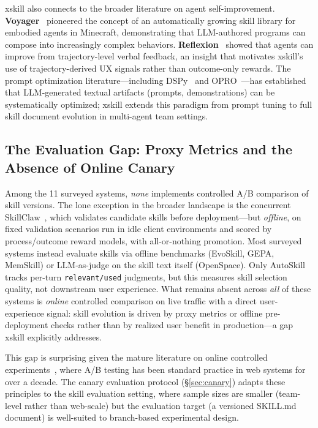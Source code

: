 \documentclass{article}
\begin{document}
xskill also connects to the broader literature on agent self-improvement. \textbf{Voyager}~\citep{wang2023voyager} pioneered the concept of an automatically growing skill library for embodied agents in Minecraft, demonstrating that LLM-authored programs can compose into increasingly complex behaviors. \textbf{Reflexion}~\citep{shinn2023reflexion} showed that agents can improve from trajectory-level verbal feedback, an insight that motivates xskill's use of trajectory-derived UX signals rather than outcome-only rewards. The prompt optimization literature---including DSPy~\citep{khattab2023dspy} and OPRO~\citep{yang2024opro}---has established that LLM-generated textual artifacts (prompts, demonstrations) can be systematically optimized; xskill extends this paradigm from prompt tuning to full skill document evolution in multi-agent team settings.

\subsection{The Evaluation Gap: Proxy Metrics and the Absence of Online Canary}

Among the 11 surveyed systems, \emph{none} implements controlled A/B comparison of skill versions. The lone exception in the broader landscape is the concurrent SkillClaw~\citep{amapml2026skillclaw}, which validates candidate skills before deployment---but \emph{offline}, on fixed validation scenarios run in idle client environments and scored by process/outcome reward models, with all-or-nothing promotion. Most surveyed systems instead evaluate skills via offline benchmarks (EvoSkill, GEPA, MemSkill) or LLM-as-judge on the skill text itself (OpenSpace). Only AutoSkill tracks per-turn \texttt{relevant/used} judgments, but this measures skill selection quality, not downstream user experience. What remains absent across \emph{all} of these systems is \emph{online} controlled comparison on live traffic with a direct user-experience signal: skill evolution is driven by proxy metrics or offline pre-deployment checks rather than by realized user benefit in production---a gap xskill explicitly addresses.

This gap is surprising given the mature literature on online controlled experiments~\citep{kohavi2013online, kohavi2020trustworthy}, where A/B testing has been standard practice in web systems for over a decade. The canary evaluation protocol (\S\ref{sec:canary}) adapts these principles to the skill evaluation setting, where sample sizes are smaller (team-level rather than web-scale) but the evaluation target (a versioned SKILL.md document) is well-suited to branch-based experimental design.
\end{document}
